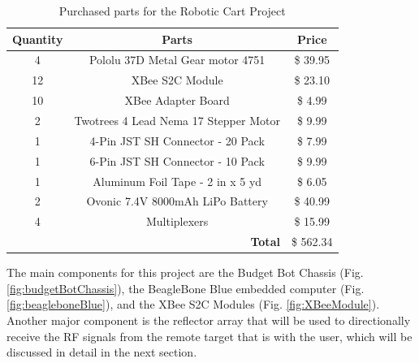 \begin{table}[H]
  \centering
  \caption{Purchased parts for the Robotic Cart Project}
  \begin{tabular}{c|c|c}
    \toprule
    \textbf{Quantity} & \textbf{Parts} & \textbf{Price}\\
    \toprule
    4 & Pololu 37D Metal Gear motor 4751 & \$ 39.95\\
    12 & XBee S2C Module & \$ 23.10\\
    10 & XBee Adapter Board & \$ 4.99\\
    2 & Twotrees 4 Lead Nema 17 Stepper Motor & \$ 9.99\\
    1 & 4-Pin JST SH Connector - 20 Pack & \$ 7.99\\
    1 & 6-Pin JST SH Connector - 10 Pack & \$ 9.99\\
    1 & Aluminum Foil Tape - 2 in x 5 yd & \$ 6.05\\
    2 & Ovonic 7.4V 8000mAh LiPo Battery & \$ 40.99\\
    4 & Multiplexers & \$ 15.99\\
    \bottomrule
    \multicolumn{2}{r|}{\textbf{Total}} & \$ 562.34\\
    \bottomrule
  \end{tabular}
  \label{tab:Partslist}
\end{table}

\vspace*{6pt}
\noindent
The main components for this project are the Budget Bot Chassis (Fig.
\ref{fig:budgetBotChassis}), the BeagleBone Blue embedded computer (Fig.
\ref{fig:beagleboneBlue}), and the XBee S2C Modules (Fig. \ref{fig:XBeeModule}).
Another major component is the reflector array that will be used to
directionally receive the RF signals from the remote target that is with the
user, which will be discussed in detail in the next section.

